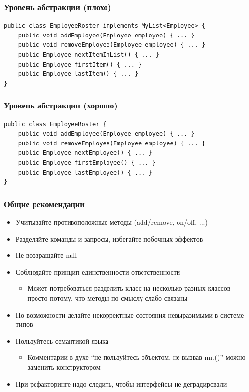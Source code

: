 \documentclass{../../slides-style}
\begin{document}
    \begin{frame}[fragile]
        \frametitle{Уровень абстракции (плохо)}
        \begin{verbatim}
public class EmployeeRoster implements MyList<Employee> {
    public void addEmployee(Employee employee) { ... }
    public void removeEmployee(Employee employee) { ... }
    public Employee nextItemInList() { ... }
    public Employee firstItem() { ... }
    public Employee lastItem() { ... }
}
        \end{verbatim}
    \end{frame}

    \begin{frame}[fragile]
        \frametitle{Уровень абстракции (хорошо)}
        \begin{verbatim}
public class EmployeeRoster {
    public void addEmployee(Employee employee) { ... }
    public void removeEmployee(Employee employee) { ... }
    public Employee nextEmployee() { ... }
    public Employee firstEmployee() { ... }
    public Employee lastEmployee() { ... }
}
        \end{verbatim}
    \end{frame}

    \begin{frame}
        \frametitle{Общие рекомендации}
        \begin{itemize}
            \item Учитывайте противоположные методы (add/remove, on/off, ...)
            \item Разделяйте команды и запросы, избегайте побочных эффектов
            \item Не возвращайте null
            \item Соблюдайте принцип единственности ответственности
            \begin{itemize}
                \item Может потребоваться разделить класс на несколько разных классов просто потому, что методы по смыслу слабо связаны
            \end{itemize}
            \item По возможности делайте некорректные состояния невыразимыми в системе типов
            \item Пользуйтесь семантикой языка
            \begin{itemize}
                \item Комментарии в духе ``не пользуйтесь объектом, не вызвав  init()'' можно заменить конструктором
            \end{itemize}
            \item При рефакторинге надо следить, чтобы интерфейсы не деградировали
        \end{itemize}
    \end{frame}
\end{document}
